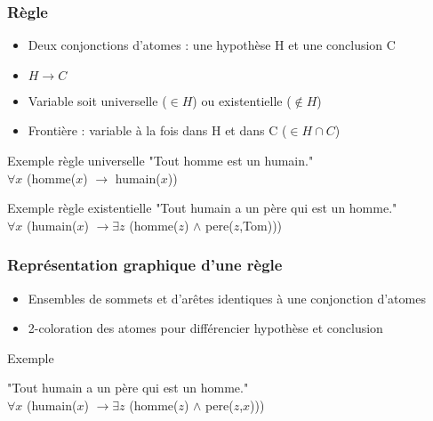\begin{frame}[t]
	\frametitle{Règle}
	\vspace{10mm}
	\begin{center}
	\begin{itemize}
		\item Deux conjonctions d'atomes : une hypothèse H et une conclusion C
		\item $H \rightarrow C$
		\item Variable soit universelle ($\in H$) ou existentielle ($\notin H$)
		\item Frontière : variable à la fois dans H et dans C ($\in H \cap C$)\\
	\end{itemize}

	\begin{exampleblock}{Exemple règle universelle}
		"Tout homme est un humain."\\
		$\forall x$ (homme($x$) $\rightarrow$ humain($x$))
	\end{exampleblock}

	\begin{exampleblock}{Exemple règle existentielle}
		"Tout humain a un père qui est un homme."\\
		$\forall x$ (humain($x$) $\rightarrow \exists z$ (homme($z$) $\wedge$ pere($z$,Tom)))
	\end{exampleblock}
	\end{center}
\end{frame}

\begin{frame}
	\frametitle{Représentation graphique d'une règle}
	\begin{center}
	\begin{itemize}
		\item Ensembles de sommets et d'arêtes identiques à une conjonction d'atomes
		\item 2-coloration des atomes pour différencier hypothèse et conclusion
	\end{itemize}
	\begin{exampleblock}{Exemple}
		\begin{center}
		"Tout humain a un père qui est un homme."\\
		$\forall x$ (humain($x$) $\rightarrow \exists z$ (homme($z$) $\wedge$
		pere($z$,$x$)))
		\end{center}
	\end{exampleblock}
	\end{center}
\end{frame}

